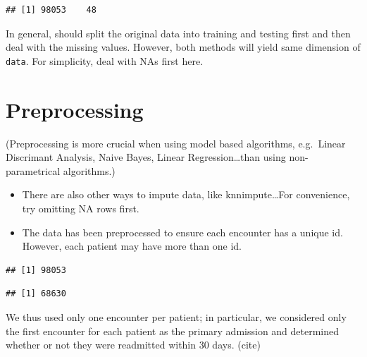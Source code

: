 \documentclass[]{article}
\newenvironment{Shaded}{\begin{snugshade}}{\end{snugshade}}
\newcommand{\KeywordTok}[1]{\textcolor[rgb]{0.13,0.29,0.53}{\textbf{{#1}}}}
\newcommand{\NormalTok}[1]{{#1}}
\begin{document}
\begin{verbatim}
## [1] 98053    48
\end{verbatim}

In general, should split the original data into training and testing
first and then deal with the missing values. However, both methods will
yield same dimension of \texttt{data}. For simplicity, deal with NAs
first here.

\section{Preprocessing}\label{preprocessing}

(Preprocessing is more crucial when using model based algorithms,
e.g.~Linear Discrimant Analysis, Naive Bayes, Linear
Regression\ldots{}than using non-parametrical algorithms.)

\begin{itemize}
\item
  There are also other ways to impute data, like knnimpute\ldots{}For
  convenience, try omitting NA rows first.
\item
  The data has been preprocessed to ensure each encounter has a unique
  id. However, each patient may have more than one id.
\end{itemize}

\begin{Shaded}
\end{Shaded}

\begin{verbatim}
## [1] 98053
\end{verbatim}

\begin{Shaded}
\end{Shaded}

\begin{verbatim}
## [1] 68630
\end{verbatim}

We thus used only one encounter per patient; in particular, we
considered only the first encounter for each patient as the primary
admission and determined whether or not they were readmitted within 30
days. (cite)
\end{document}
